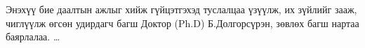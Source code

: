 
\begin{acknowledgements}
\addchaptertocentry{\acknowledgementname}

Энэхүү бие даалтын ажлыг хийж гүйцэтгэхэд туслалцаа үзүүлж, их зүйлийг зааж, чиглүүлж өгсөн удирдагч багш Доктор (Ph.D) Б.Долгорсүрэн, зөвлөх багш нартаа баярлалаа. \ldots

\end{acknowledgements}

